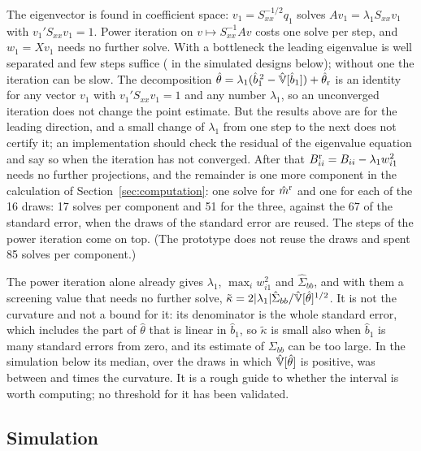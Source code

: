 The eigenvector is found in coefficient space: $v_1=S_{xx}^{-1/2}q_1$ solves $Av_1=\lambda_1S_{xx}v_1$ with
$v_1'S_{xx}v_1=1$. Power iteration on $v\mapsto S_{xx}^{-1}Av$ costs one solve per step, and $w_1=Xv_1$ needs no
further solve. With a bottleneck the leading eigenvalue is well separated and few steps suffice
( in the simulated designs below); without one the iteration can be slow. The decomposition
$\hat\theta=\lambda_1(\hat b_1^{\,2}-\hat{\mathbb{V}}[\hat b_1])+\hat\theta_{\rm r}$ is an identity for any vector $v_1$ with
$v_1'S_{xx}v_1=1$ and any number $\lambda_1$, so an unconverged iteration does not change the point estimate.
But the results above are for the leading direction, and a small change of $\lambda_1$ from one step to the
next does not certify it; an implementation should check the residual of the eigenvalue equation and say so
when the iteration has not converged. After that $B^{\rm r}_{ii}=B_{ii}-\lambda_1w_{i1}^2$ needs no further
projections, and the remainder is one more component in the calculation of Section~\ref{sec:computation}: one
solve for $\hat m^{\rm r}$ and one for each of the 16 draws: 17 solves per component and 51 for the three, against
the 67 of the standard error, when the draws of the standard error are reused. The steps of the power iteration
come on top. (The prototype does not reuse the draws and spent 85 solves per component.)

The power iteration alone already gives $\lambda_1$, $\max_iw_{i1}^2$ and $\hat\Sigma_{bb}$, and with them a
screening value that needs no further solve,
$\tilde\kappa=2|\lambda_1|\hat\Sigma_{bb}/\hat{\mathbb{V}}[\hat\theta]^{1/2}$. It is not the curvature and not a bound for it:
its denominator is the whole standard error, which includes the part of $\hat\theta$ that is linear in $\hat b_1$,
so $\tilde\kappa$ is small also when $\hat b_1$ is many standard errors from zero, and its estimate of
$\Sigma_{bb}$ can be too large. In the simulation below its median, over the draws in which
$\hat{\mathbb{V}}[\hat\theta]$ is positive, was between  and  times the
curvature. It is a rough guide to whether the interval is worth computing; no
threshold for it has been validated.

\subsection{Simulation}\label{sec:q1sim}

